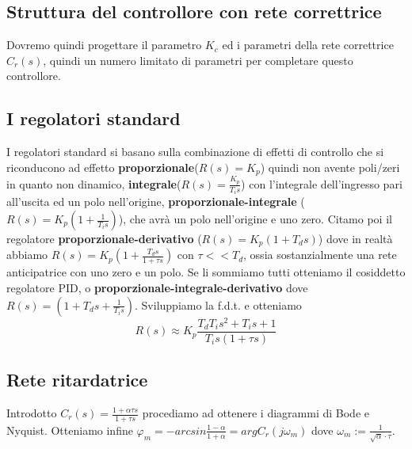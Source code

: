 \documentclass[11pt]{article}
\begin{document}
\subsection{Struttura del controllore con rete correttrice}
Dovremo quindi progettare il parametro $K_c$ ed i parametri della rete correttrice $C_r(s)$, quindi un numero limitato di parametri per completare questo controllore.
\subsection{I regolatori standard}
I regolatori standard si basano sulla combinazione di effetti di controllo che si riconducono ad effetto \textbf{proporzionale}($R(s)=K_p$) quindi non avente poli/zeri in quanto non dinamico, \textbf{integrale}($R(s)=\frac{K_p}{T_is}$) con l'integrale dell'ingresso pari all'uscita ed un polo nell'origine, \textbf{proporzionale-integrale} ($R(s)=K_p\left(1+\frac{1}{T_is}\right)$), che avrà un polo nell'origine e uno zero. Citamo poi il regolatore \textbf{proporzionale-derivativo} ($R(s)=K_p(1+T_ds)$) dove in realtà abbiamo $R(s)=K_p\left(1+\frac{T_ds}{1+\tau s}\right)$ con $\tau<<T_d$, ossia sostanzialmente una rete anticipatrice con uno zero e un polo. Se li sommiamo tutti otteniamo il cosiddetto regolatore PID, o \textbf{proporzionale-integrale-derivativo} dove $R(s)=\left(1+T_ds+\frac{1}{T_is}\right)$. Sviluppiamo la f.d.t. e otteniamo \begin{displaymath}
    R(s)\approx K_p \frac{T_dT_is^2+T_is+1}{T_is(1+\tau s)}
\end{displaymath}
\subsection{Rete ritardatrice}
Introdotto $C_r(s) = \frac{1+\alpha\tau s}{1+\tau s}$ procediamo ad ottenere i diagrammi di Bode e Nyquist. Otteniamo infine $\varphi_m = -arcsin\frac{1-\alpha}{1+\alpha}=argC_r(j\omega_m)$ dove $\omega_m := \frac{1}{\sqrt{\alpha}\cdot \tau}$.
\end{document}
